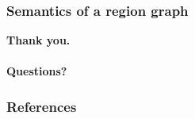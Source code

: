 \documentclass[usenames,dvipsnames]{beamer}
\begin{document}
\begin{frame}
  \frametitle{Semantics of a region graph}
\end{frame}

\begin{frame}[standout]
  \textbf{Thank you.\\~\\Questions?}
\end{frame}

\begin{frame}[t,allowframebreaks]
  \frametitle{References}
  \printbibliography[heading=none]
\end{frame}
\end{document}
